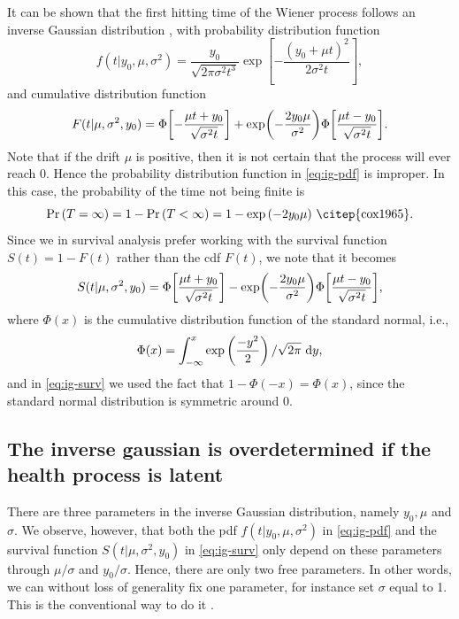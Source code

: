 It can be shown that the first hitting time of the Wiener process follows an inverse Gaussian distribution \citep{chhikara1988}, with probability distribution function
\begin{equation}
\label{eq:ig-pdf}
    f(t|y_0,\mu,\sigma^2)=\frac{y_0}{\sqrt{2\pi\sigma^2t^3}}\exp\left[-\frac{(y_0+\mu t)^2}{2\sigma^2t}\right],
\end{equation}
and cumulative distribution function
\begin{equation}
\label{eq:ig-cdf}
    F(t|\mu,\sigma^2,y_0)=\Phi\sqb*{-\frac{\mu t+y_0}{\sqrt{\sigma^2t}}}+\exp\p*{-\frac{2y_0\mu}{\sigma^2}}\Phi\sqb*{\frac{\mu t-y_0}{\sqrt{\sigma^2t}}}.
\end{equation}
Note that if the drift $\mu$ is positive, then it is not certain that the process will ever reach 0. Hence the probability distribution function in \eqref{eq:ig-pdf} is improper. In this case, the probability of the time not being finite is
\begin{equation*}
    \Pr{}(T=\infty)=1-\Pr{}(T<\infty)=1-\exp{(-2y_0\mu)} \text{ \citep{cox1965}}.
\end{equation*}
Since we in survival analysis prefer working with the survival function $S(t)=1-F(t)$ rather than the cdf $F(t)$, we note that it becomes
\begin{equation}
\label{eq:ig-surv}
    S(t|\mu,\sigma^2,y_0)=\Phi\sqb*{\frac{\mu t+y_0}{\sqrt{\sigma^2t}}}-\exp\p*{-\frac{2y_0\mu}{\sigma^2}}\Phi\sqb*{\frac{\mu t-y_0}{\sqrt{\sigma^2t}}},
\end{equation}
where $\Phi(x)$ is the cumulative distribution function of the standard normal, i.e.,
\begin{equation}
    \Phi(x)=\int_{-\infty}^x\exp\left(\frac{-y^2}{2}\right)/\sqrt{2\pi}\text{~d}y,
\end{equation}
and in \eqref{eq:ig-surv} we used the fact that $1-\Phi(-x)=\Phi(x)$, since the standard normal distribution is symmetric around 0.

\subsection{The inverse gaussian is overdetermined if the health process is latent}
There are three parameters in the inverse Gaussian distribution, namely $y_0, \mu$ and $\sigma$. We observe, however, that both the pdf $f(t|y_0,\mu,\sigma^2)$ in \eqref{eq:ig-pdf} and the survival function $S(t|\mu,\sigma^2,y_0)$ in \eqref{eq:ig-surv} only depend on these parameters through $\mu/\sigma$ and $y_0/\sigma$. Hence, there are only two free parameters. In other words, we can without loss of generality fix one parameter, for instance set $\sigma$ equal to 1. This is the conventional way to do it \citep{leewhitmore2006}.

